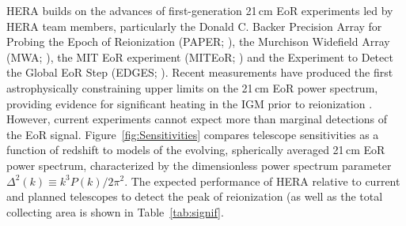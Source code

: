 \documentclass[preprint,11pt]{aastex}
\begin{document}
HERA builds on the advances of first-generation
21\,cm EoR experiments led by HERA team members, particularly 
the Donald C. Backer Precision Array for Probing the Epoch of Reionization (PAPER; \citealt{parsons_et_al2010}),
the Murchison Widefield Array (MWA; \citealt{bowman_et_al2012,tingay_et_al2013}),
the MIT EoR experiment (MITEoR; \citealt{zheng_et_al2014}) and the Experiment to Detect the Global EoR Step (EDGES; \citealt{bowman_rogers2010}).
Recent measurements
have produced the first astrophysically constraining upper limits on the 21\,cm EoR power spectrum, 
providing evidence for significant heating in the IGM prior to reionization \citep{parsons_etal2014, parsons_et_al2015, ali_et_al2015,pober_et_al2015}.
However, current experiments cannot expect more than marginal detections of the EoR signal. 
Figure~\ref{fig:Sensitivities} compares telescope sensitivities as a function of redshift to models of 
the evolving, spherically averaged 21\,cm EoR power spectrum, characterized by the dimensionless power spectrum parameter $\Delta^2 (k) \equiv k^3 P(k) / 2 \pi^2$.
The expected performance of HERA relative to current and planned telescopes to detect the peak of reionization (as well as the total collecting area is shown in 
Table~\ref{tab:signif}.  


\end{document}
